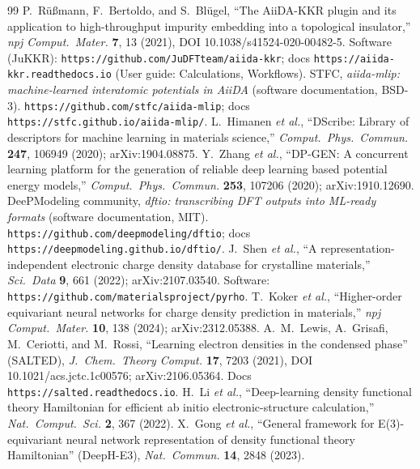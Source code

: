 \documentclass[11pt]{article}
\begin{document}
\begin{thebibliography}{99}
 P.~R\"u{\ss}mann, F.~Bertoldo, and S.~Bl\"ugel, ``The AiiDA-KKR plugin and its application to
  high-throughput impurity embedding into a topological insulator,'' \emph{npj Comput.\ Mater.} \textbf{7}, 13
  (2021), DOI 10.1038/s41524-020-00482-5. Software (JuKKR): \texttt{https://github.com/JuDFTteam/aiida-kkr};
  docs \texttt{https://aiida-kkr.readthedocs.io} (User guide: Calculations, Workflows).
 STFC, \emph{aiida-mlip: machine-learned interatomic potentials in AiiDA} (software
  documentation, BSD-3). \texttt{https://github.com/stfc/aiida-mlip}; docs
  \texttt{https://stfc.github.io/aiida-mlip/}.
 L.~Himanen \emph{et al.}, ``DScribe: Library of descriptors for machine learning in materials
  science,'' \emph{Comput.\ Phys.\ Commun.} \textbf{247}, 106949 (2020); arXiv:1904.08875.
 Y.~Zhang \emph{et al.}, ``DP-GEN: A concurrent learning platform for the generation of reliable
  deep learning based potential energy models,'' \emph{Comput.\ Phys.\ Commun.} \textbf{253}, 107206 (2020);
  arXiv:1910.12690.
 DeePModeling community, \emph{dftio: transcribing DFT outputs into ML-ready formats} (software
  documentation, MIT). \texttt{https://github.com/deepmodeling/dftio}; docs
  \texttt{https://deepmodeling.github.io/dftio/}.
 J.~Shen \emph{et al.}, ``A representation-independent electronic charge density database for
  crystalline materials,'' \emph{Sci.\ Data} \textbf{9}, 661 (2022); arXiv:2107.03540. Software:
  \texttt{https://github.com/materialsproject/pyrho}.
 T.~Koker \emph{et al.}, ``Higher-order equivariant neural networks for charge density
  prediction in materials,'' \emph{npj Comput.\ Mater.} \textbf{10}, 138 (2024); arXiv:2312.05388.
 A.~M.~Lewis, A.~Grisafi, M.~Ceriotti, and M.~Rossi, ``Learning electron densities in the
  condensed phase'' (SALTED), \emph{J.\ Chem.\ Theory Comput.} \textbf{17}, 7203 (2021), DOI
  10.1021/acs.jctc.1c00576; arXiv:2106.05364. Docs \texttt{https://salted.readthedocs.io}.
 H.~Li \emph{et al.}, ``Deep-learning density functional theory Hamiltonian for efficient ab
  initio electronic-structure calculation,'' \emph{Nat.\ Comput.\ Sci.} \textbf{2}, 367 (2022).
 X.~Gong \emph{et al.}, ``General framework for E(3)-equivariant neural network representation
  of density functional theory Hamiltonian'' (DeepH-E3), \emph{Nat.\ Commun.} \textbf{14}, 2848 (2023).
\end{thebibliography}
\end{document}
